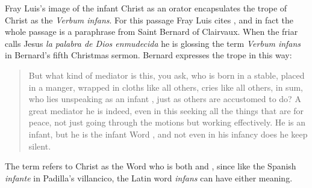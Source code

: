 Fray Luis's image of the infant Christ as an orator encapsulates the trope of
Christ as the \emph{Verbum infans}.
For this passage Fray Luis cites , and in fact the whole
passage is a paraphrase from Saint Bernard of Clairvaux.
When the friar calls Jesus \emph{la palabra de Dios enmudecida} he is glossing
the term \emph{Verbum infans} in Bernard's fifth Christmas sermon.
Bernard expresses the trope in this way:
\begin{quote}
    But what kind of mediator is this, you ask, who is born in a stable, placed
    in a manger, wrapped in cloths like all others, cries like all others, in
    sum, who lies unspeaking as an infant , just as others
    are accustomed to do?
    A great mediator he is indeed, even in this seeking all the things that are
    for peace, not just going through the motions but working effectively.  He
    is an infant, but he is the infant Word , and not
    even in his infancy does he keep silent.%
        \Autocite
        [128A, Sermo V: .]
        {Bernard:Nativitate}
\end{quote}
The term refers to Christ as the Word who is both  and
, since like the Spanish \emph{infante} in Padilla's
villancico, the Latin word \emph{infans} can have either meaning.

